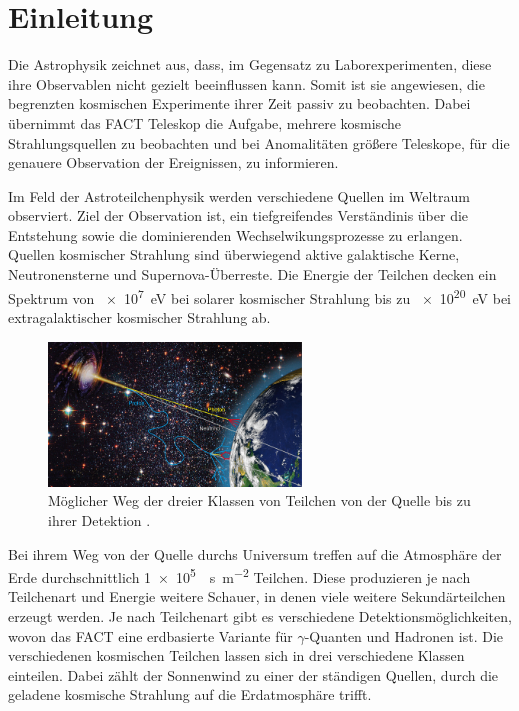 \chapter{Einleitung}
Die Astrophysik zeichnet aus, dass, im Gegensatz zu Laborexperimenten, diese ihre Observablen nicht gezielt beeinflussen kann.
Somit ist sie angewiesen, die begrenzten kosmischen Experimente ihrer Zeit passiv zu beobachten. 
Dabei übernimmt das FACT Teleskop die Aufgabe, mehrere kosmische Strahlungsquellen zu beobachten und bei Anomalitäten größere Teleskope, für die genauere Observation der Ereignissen, zu informieren. 

Im Feld der Astroteilchenphysik werden verschiedene Quellen im Weltraum observiert.
Ziel der Observation ist, ein tiefgreifendes Verständinis über die Entstehung sowie die dominierenden Wechselwikungsprozesse zu erlangen. 
Quellen kosmischer Strahlung sind überwiegend aktive galaktische Kerne, Neutronensterne und Supernova-Überreste. 
Die Energie der Teilchen decken ein Spektrum von \SI{e7}{\electronvolt} bei solarer kosmischer Strahlung bis zu \SI{e20}{\electronvolt} bei extragalaktischer kosmischer Strahlung ab. 

\begin{figure}
  \centering
  \includegraphics[width=0.6\textwidth]{./images/sources-detection.jpg}
  \caption{Möglicher Weg der dreier Klassen von Teilchen von der Quelle bis zu ihrer Detektion \cite{overview-detec}.}
\end{figure}

Bei ihrem Weg von der Quelle durchs Universum treffen auf die Atmosphäre der Erde durchschnittlich \SI{1e5}{\per\second\per\meter\squared} Teilchen.
Diese produzieren je nach Teilchenart und Energie weitere Schauer, in denen viele weitere Sekundärteilchen erzeugt werden. 
Je nach Teilchenart gibt es verschiedene Detektionsmöglichkeiten, wovon das FACT eine erdbasierte Variante für $\gamma$-Quanten und Hadronen ist. 
Die verschiedenen kosmischen Teilchen lassen sich in drei verschiedene Klassen einteilen. 
Dabei zählt der Sonnenwind zu einer der ständigen Quellen, durch die geladene kosmische Strahlung auf die Erdatmosphäre trifft.

